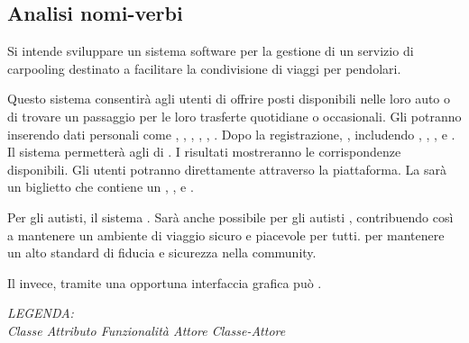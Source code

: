 \subsection{Analisi nomi-verbi}

Si intende sviluppare un sistema software per la gestione di un servizio di carpooling destinato a facilitare la condivisione di viaggi per pendolari. 

Questo sistema consentirà agli utenti di offrire posti disponibili nelle loro auto o di trovare un passaggio per le loro trasferte quotidiane o occasionali.
Gli  potranno  inserendo dati personali come , , , , , . Dopo la registrazione,   , includendo , , , e .
Il sistema permetterà agli  di . I risultati mostreranno le corrispondenze disponibili. Gli utenti potranno  direttamente attraverso la piattaforma. La  sarà un biglietto che contiene un , ,  e .

Per gli autisti, il sistema . Sarà anche possibile per gli autisti , contribuendo così a mantenere un ambiente di viaggio sicuro e piacevole per tutti.
 per mantenere un alto standard di fiducia e sicurezza nella community. 

Il  invece, tramite una opportuna interfaccia grafica può .


\vspace{5mm}
\textit{LEGENDA: \\
\NVclass{$\blacksquare$} Classe \hfill
\NVattr{$\blacksquare$} Attributo \hfill
\NVfunc{$\blacksquare$} Funzionalità \hfill
\NVactor{$\blacksquare$} Attore \hfill
\NVclassActor{$\blacksquare$} Classe-Attore}